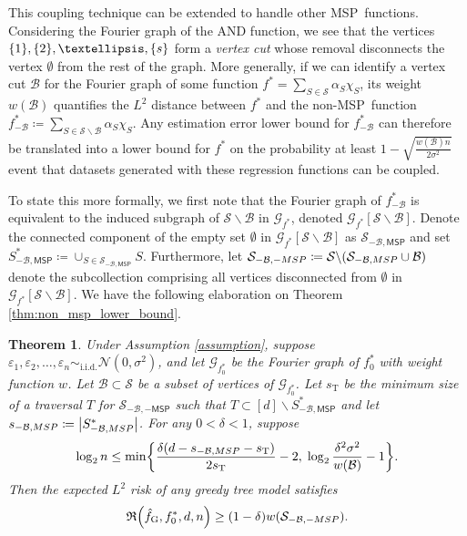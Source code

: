 \documentclass[11pt]{article}
\newtheorem{theorem}{Theorem}[section]
\DeclarePairedDelimiter{\braces}{\lbrace}{\rbrace}
\DeclarePairedDelimiter{\paren}{(}{)}
\DeclarePairedDelimiter{\abs}{|}{|}
\newcommand{\sparsity}{s}
\newcommand{\nfeats}{d}
\newcommand{\nsamples}{n}
\newcommand{\coordindices}{[\nfeats]}
\newcommand{\MSP}{\textsf{MSP}}
\newcommand{\suppset}{S^*}
\newcommand{\cutset}{\mathcal{B}}
\newcommand{\fgreedy}{\hat{f}_{\operatorname{G}}}
\newcommand{\monomial}{\chi}
\newcommand{\traversal}{T}
\newcommand{\fcoefs}{\mathcal{S}}
\newcommand{\objective}{\mathfrak{R}}
\newcommand{\traversalsize}{\sparsity_{\operatorname{T}}}
\begin{document}
This coupling technique can be extended to handle other \MSP~functions.
Considering the Fourier graph of the AND function, we see that the vertices $\braces*{1},\braces{2},\ldots,\braces{\sparsity}$ form a \emph{vertex cut} whose removal disconnects the vertex $\emptyset$ from the rest of the graph.
More generally, if we can identify a vertex cut $\cutset$ for the Fourier graph of some function $f^* = \sum_{S \in \fcoefs} \alpha_S\monomial_S$, its weight $w(\cutset)$ quantifies the $L^2$ distance between $f^*$ and the non-\MSP~function $f^*_{-\cutset} \coloneqq \sum_{S \in \fcoefs\backslash\cutset} \alpha_S\monomial_S$.
Any estimation error lower bound for $f^*_{-\cutset}$ can therefore be translated into a lower bound for $f^*$ on the probability at least $1-\sqrt{\frac{w(\cutset)\nsamples}{2\sigma^2}}$ event that datasets generated with these regression functions can be coupled.

To state this more formally, we first note that the Fourier graph of $f^*_{-\cutset}$ is equivalent to the induced subgraph of $\fcoefs\backslash\cutset$ in $\mathcal{G}_{f^*}$, denoted $\mathcal{G}_{f^*}[\fcoefs\backslash\cutset]$.
Denote the connected component of the empty set $\emptyset$ in $\mathcal{G}_{f^*}[\fcoefs\backslash\cutset]$ as $\fcoefs_{-\cutset,\MSP}$ and set $\suppset_{-\cutset,\MSP} \coloneqq \cup_{S \in \fcoefs_{-\cutset,\MSP}} S$.
Furthermore, let $\fcoefs_{-\cutset,-\MSP} \coloneqq \fcoefs\backslash\paren*{\fcoefs_{-\cutset,\MSP}\cup\cutset}$ denote the subcollection comprising all vertices disconnected from $\emptyset$ in $\mathcal{G}_{f^*}[\fcoefs\backslash\cutset]$.
We have the following elaboration on Theorem \ref{thm:non_msp_lower_bound}.

\begin{theorem}
    \label{thm:robust_lower_bounds}
    Under Assumption \ref{assumption}, suppose $\varepsilon_1,\varepsilon_2,\ldots,\varepsilon_\nsamples \sim_{\text{i.i.d.}} \mathcal{N}(0,\sigma^2)$, and let $\mathcal{G}_{f_0^*}$ be the Fourier graph of $f_0^*$ with weight function $w$.
    Let $\cutset \subset \mathcal{S}$ be a subset of vertices of $\mathcal{G}_{f_0^*}$.
    Let $\traversalsize$ be the minimum size of a traversal $\traversal$ for $\fcoefs_{-\cutset,-\MSP}$ such that $\traversal \subset \coordindices \backslash \suppset_{-\cutset,\MSP}$ and let $s_{-\cutset,\MSP} \coloneqq \abs*{\suppset_{-\cutset,\MSP}}$.
    For any $0 < \delta < 1$, suppose
    \begin{equation}
        \log_2 n \leq \min\braces*{{\frac{\delta\paren*{\nfeats - s_{-\cutset,\MSP} - \traversalsize}}{2\traversalsize} - 2},\; \log_2\frac{\delta^2\sigma^2}{w(\cutset)} - 1}.
    \end{equation}
    Then the expected $L^2$ risk of any greedy tree model satisfies
    \begin{equation}
        \objective\paren*{\fgreedy, f^*_0,\nfeats,\nsamples} \geq (1-\delta)w\paren*{\fcoefs_{-\cutset,-\MSP}}.
    \end{equation}
\end{theorem}
\end{document}

